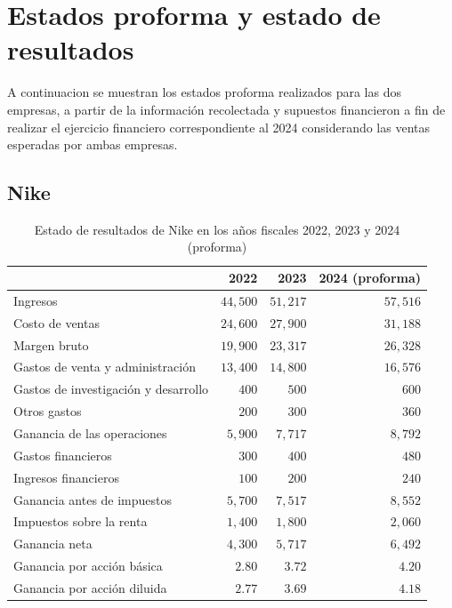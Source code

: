 \documentclass[a4paper,12pt]{article}
\begin{document}
\clearpage
\newpage

\section{Estados proforma y estado de resultados}

A continuacion se muestran los estados proforma realizados para las dos empresas, a partir de la información recolectada y supuestos financieron a fin de realizar el ejercicio financiero correspondiente al 2024 considerando las ventas esperadas por ambas empresas.\par

\subsection{Nike}


\begin{table}[h]
\centering
\caption{Estado de resultados de Nike en los años fiscales 2022, 2023 y 2024 (proforma)}
\vspace{1cm}
\begin{tabular}{lrrr}
\toprule
 & \textbf{2022} & \textbf{2023} & \textbf{2024 (proforma)} \\
\midrule
Ingresos & $44,500$ & $51,217$ & $57,516$ \\
Costo de ventas & $24,600$ & $27,900$ & $31,188$ \\
\midrule
Margen bruto & $19,900$ & $23,317$ & $26,328$ \\
Gastos de venta y administración & $13,400$ & $14,800$ & $16,576$ \\
Gastos de investigación y desarrollo & $400$ & $500$ & $600$ \\
Otros gastos & $200$ & $300$ & $360$ \\
\midrule
Ganancia de las operaciones & $5,900$ & $7,717$ & $8,792$ \\
Gastos financieros & $300$ & $400$ & $480$ \\
Ingresos financieros & $100$ & $200$ & $240$ \\
\midrule
Ganancia antes de impuestos & $5,700$ & $7,517$ & $8,552$ \\
Impuestos sobre la renta & $1,400$ & $1,800$ & $2,060$ \\
\midrule
Ganancia neta & $4,300$ & $5,717$ & $6,492$ \\
Ganancia por acción básica & $2.80$ & $3.72$ & $4.20$ \\
Ganancia por acción diluida & $2.77$ & $3.69$ & $4.18$ \\
\bottomrule
\end{tabular}
\end{table}
\end{document}
